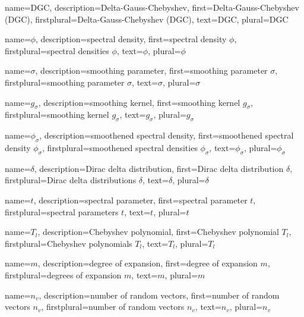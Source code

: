 {%
  name={DGC},%
  description={Delta-Gauss-Chebyshev},%
  first={Delta-Gauss-Chebyshev (DGC)},%
  firstplural={Delta-Gauss-Chebyshev (DGC)},%
  text={DGC},%
  plural={DGC}%
}


{%
  name={$\phi$},%
  description={spectral density},%
  first={spectral density $\phi$},%
  firstplural={spectral densities $\phi$},%
  text={$\phi$},%
  plural={$\phi$}%
}

{%
  name={$\sigma$},%
  description={smoothing parameter},%
  first={smoothing parameter $\sigma$},%
  firstplural={smoothing parameter $\sigma$},%
  text={$\sigma$},%
  plural={$\sigma$}%
}

{%
  name={$g_{\sigma}$},%
  description={smoothing kernel},%
  first={smoothing kernel $g_{\sigma}$},%
  firstplural={smoothing kernel $g_{\sigma}$},%
  text={$g_{\sigma}$},%
  plural={$g_{\sigma}$}%
}

{%
  name={$\phi_{\sigma}$},%
  description={smoothened spectral density},%
  first={smoothened spectral density $\phi_{\sigma}$},%
  firstplural={smoothened spectral densities $\phi_{\sigma}$},%
  text={$\phi_{\sigma}$},%
  plural={$\phi_{\sigma}$}%
}

{%
  name={$\delta$},%
  description={Dirac delta distribution},%
  first={Dirac delta distribution $\delta$},%
  firstplural={Dirac delta distributions $\delta$},%
  text={$\delta$},%
  plural={$\delta$}%
}

{%
  name={$t$},%
  description={spectral parameter},%
  first={spectral parameter $t$},%
  firstplural={spectral parameters $t$},%
  text={$t$},%
  plural={$t$}%
}

{%
  name={$T_l$},%
  description={Chebyshev polynomial},%
  first={Chebyshev polynomial $T_l$},%
  firstplural={Chebyshev polynomials $T_l$},%
  text={$T_l$},%
  plural={$T_l$}%
}

{%
  name={$m$},%
  description={degree of expansion},%
  first={degree of expansion $m$},%
  firstplural={degrees of expansion $m$},%
  text={$m$},%
  plural={$m$}%
}

{%
  name={$n_v$},%
  description={number of random vectors},%
  first={number of random vectors $n_v$},%
  firstplural={number of random vectors $n_v$},%
  text={$n_v$},%
  plural={$n_v$}%
}

